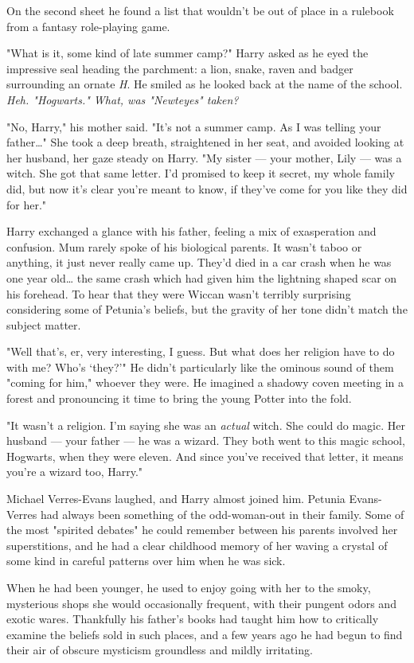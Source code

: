 On the second sheet he found a list that wouldn't be out
of place in a rulebook from a fantasy role-playing game.

"What is it, some kind of late summer camp?" Harry
asked as he eyed the impressive seal heading the
parchment: a lion, snake, raven and badger surrounding
an ornate \emph{H}. He smiled as he looked back at the name of
the school. \emph{Heh. "Hogwarts." What, was "Newteyes" taken?}

"No, Harry," his mother said. "It's not a summer camp. As
I was telling your father{\ldots}" She took a deep breath,
straightened in her seat, and avoided looking at her
husband, her gaze steady on Harry. "My sister --- your mother,
Lily --- was a witch. She got that same letter. I'd promised
to keep it secret, my whole family did, but now it's clear
you're meant to know, if they've come for you like they
did for her."

Harry exchanged a glance with his father, feeling a mix of
exasperation and confusion. Mum rarely spoke of his
biological parents. It wasn't taboo or anything, it just never
really came up. They'd died in a car crash when he was
one year old{\ldots} the same crash which had given him the
lightning shaped scar on his forehead. To hear that they
were Wiccan wasn't terribly surprising considering some of
Petunia's beliefs, but the gravity of her tone didn't match
the subject matter.

"Well that's, er, very interesting, I guess. But what does
her religion have to do with me? Who's `they?'" He didn't
particularly like the ominous sound of them "coming for
him," whoever they were. He imagined a shadowy coven
meeting in a forest and pronouncing it time to bring the
young Potter into the fold.

"It wasn't a religion. I'm saying she was an \emph{actual} witch.
She could do magic. Her husband --- your father --- he was a
wizard. They both went to this magic school, Hogwarts,
when they were eleven. And since you've received that letter, it
means you're a wizard too, Harry."

Michael Verres-Evans laughed, and Harry almost joined
him. Petunia Evans-Verres had always been something of
the odd-woman-out in their family. Some of the most
"spirited debates" he could remember between his parents
involved her superstitions, and he had a clear childhood
memory of her waving a crystal of some kind in careful
patterns over him when he was sick.

When he had been younger, he used to enjoy going with her to
the smoky, mysterious shops she would occasionally
frequent, with their pungent odors and exotic wares.
Thankfully his father's books had taught him how to
critically examine the beliefs sold in such places, and a few
years ago he had begun to find their air of obscure
mysticism groundless and mildly irritating.

